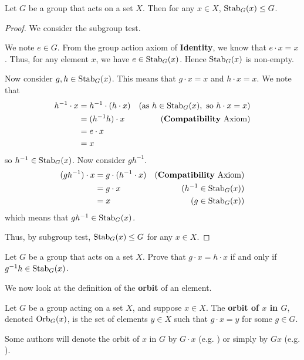 \begin{lemma}\label{lemma-stabilizer-is-subgroup}
    Let $G$ be a group that acts on a set $X$. Then for any $x \in X$, $\mathrm{Stab}_{G}(x) \leq G$.
\end{lemma}
\begin{proof}
    We consider the subgroup test.

    We note $e \in G$. From the group action axiom of \textbf{Identity}, we know that $e \cdot x = x$. Thus, for any element $x$, we have $e \in \mathrm{Stab}_{G}(x)$. Hence $\mathrm{Stab}_{G}(x)$ is non-empty.

    Now consider $g, h \in \mathrm{Stab}_{G}(x)$. This means that $g\cdot x = x$ and $h \cdot x = x$. We note that
    \begin{align*}
        h^{-1} \cdot x &= h^{-1} \cdot (h \cdot x) & (\text{as } h \in \mathrm{Stab}_{G}(x), \text{ so } h\cdot x = x)\\
        &= (h^{-1}h) \cdot x & (\text{\textbf{Compatibility} Axiom})\\
        &= e \cdot x\\
        &= x
    \end{align*}
    so $h^{-1} \in \mathrm{Stab}_{G}(x)$. Now consider $gh^{-1}$.
    \begin{align*}
        (gh^{-1}) \cdot x &= g \cdot (h^{-1} \cdot x) & (\text{\textbf{Compatibility} Axiom})\\
        &= g \cdot x & (h^{-1} \in \mathrm{Stab}_{G}(x))\\
        &= x & (g \in \mathrm{Stab}_{G}(x))
    \end{align*}
    which means that $gh^{-1} \in \mathrm{Stab}_{G}(x)$.

    Thus, by subgroup test, $\mathrm{Stab}_{G}(x) \leq G$ for any $x \in X$.
\end{proof}

\begin{exercise}\label{exercise-group-action-outputs-equal-iff-gh^-1-in-stabilizer}
    Let $G$ be a group that acts on a set $X$. Prove that $g \cdot x = h \cdot x$ if and only if $g^{-1}h \in \mathrm{Stab}_{G}(x)$.
\end{exercise}

We now look at the definition of the \textbf{orbit} of an element.
\begin{definition}
    Let $G$ be a group acting on a set $X$, and suppose $x \in X$. The \textbf{orbit of $x$ in $G$}, denoted $\mathrm{Orb}_{G}(x)$, is the set of elements $y \in X$ such that $g \cdot x = y$ for some $g \in G$.
\end{definition}
\begin{remark}
    Some authors will denote the orbit of $x$ in $G$ by $G \cdot x$ (e.g. \cite{clark_1984}) or simply by $Gx$ (e.g. \cite{milne_2021}).
\end{remark}

